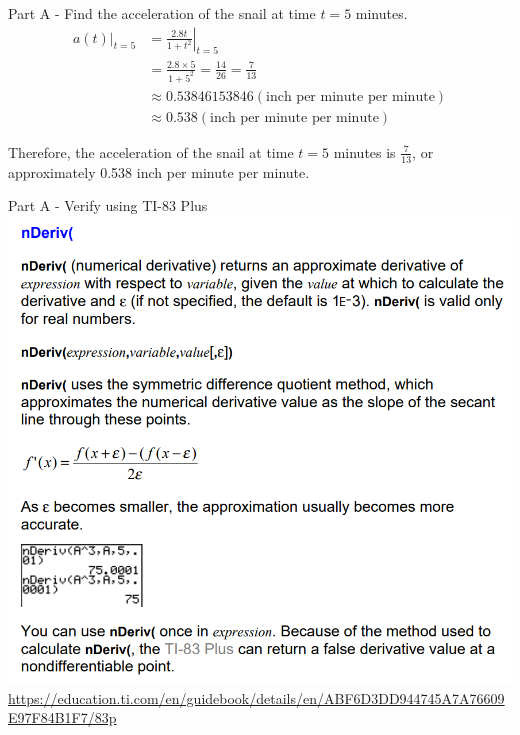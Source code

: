 \documentclass{beamer}
\begin{document}
\begin{frame}{Part A - Find the acceleration of the snail at time $t=5$ minutes.}
    \begin{align*}
        \left. a(t)\right|_{t=5} &= \left. \frac{2.8t}{1+t^2}\right|_{t=5} \\
        &= \frac{2.8\times 5}{1 + 5^2} = \frac{14}{26} = \frac{7}{13} \\
        &\approx 0.53846153846 (\text{inch per minute per minute})\\
        &\approx 0.538 (\text{inch per minute per minute}) 
    \end{align*}

    Therefore, the acceleration of the snail at time $t=5$ minutes is $\frac{7}{13}$, or approximately 0.538 inch per minute per minute.
\end{frame}

\begin{frame}{Part A - Verify using TI-83 Plus}
    \includegraphics[scale=0.34]{1}
    \tiny \url{https://education.ti.com/en/guidebook/details/en/ABF6D3DD944745A7A76609E97F84B1F7/83p}
\end{frame}
\end{document}
